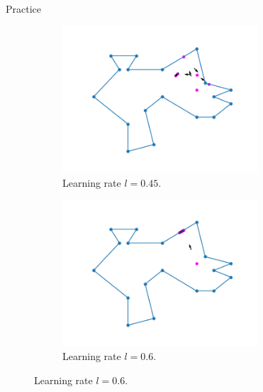 \documentclass{beamer}
\begin{document}
\begin{frame}{Practice}
\begin{figure}[h!]
\begin{subfigure}{0.45\textwidth}
			\includegraphics[width = 0.8\textwidth]{Images/random_gradient_045.png}
			\caption{Learning rate $l = 0.45$.}
			\label{fig:random_gradient_045}
		\end{subfigure}
		\begin{subfigure}{0.45\textwidth}
			\centering
			\includegraphics[width = 0.8\textwidth]{Images/random_gradient_06.png}
			\caption{Learning rate $l = 0.6$.}
			\label{fig:random_gradient_06}
		\end{subfigure}
		\label{fig:multiple_gradients}
	\end{figure}
\end{frame}
\end{document}
